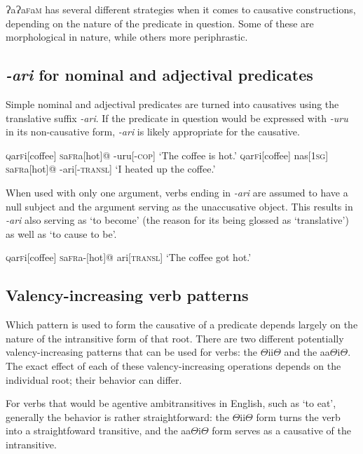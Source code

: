 \documentclass[a4paper,10pt,twoside,openright]{memoir}
\newcommand{\lang}{ɁaɁa\textsc{f}a\textsc{m}}
\newcommand{\rootpart}{$\Theta$}
\newcommand{\famword}[5]{#1\textsc{#2}#3\textsc{#4}#5}
\begin{document}
\lang{} has several different strategies when it comes to causative constructions, depending on the nature of the predicate in question. Some of these are morphological in nature, while others more periphrastic. 

\subsection{\textit{-ari} for nominal and adjectival predicates}

Simple nominal and adjectival predicates are turned into causatives using the translative suffix \textit{-ari}. If the predicate in question would be expressed with \textit{-uru} in its non-causative form, \textit{-ari} is likely appropriate for the causative.

\pex
\a
\begingl
\famword{}{q}{ar}{f}{i}[coffee]
\famword{}{s}{a}{fr}{a}[hot]@
-uru[\textsc{-cop}]
\glft `The coffee is hot.'
\endgl
\a
\begingl
\famword{}{q}{ar}{f}{i}[coffee]
nas[\textsc{1sg}]
\famword{}{s}{a}{fr}{a}[hot]@
-ari[-\textsc{transl}]
\glft `I heated up the coffee.'
\endgl
\xe

When used with only one argument, verbs ending in \textit{-ari} are assumed to have a null subject and the argument serving as the unaccusative object. This results in \textit{-ari} also serving as `to become' (the reason for its being glossed as `translative') as well as `to cause to be'.

\ex
\begingl
\famword{}{q}{ar}{f}{i}[coffee]
\famword{}{s}{a}{fr}{a}-[hot]@
ari[\textsc{transl}]
\glft `The coffee got hot.'
\endgl
\xe

\subsection{Valency-increasing verb patterns}

Which pattern is used to form the causative of a predicate depends largely on the nature of the intransitive form of that root. There are two different potentially valency-increasing patterns that can be used for verbs: the {\rootpart}ii{\rootpart} and the aa{\rootpart}i{\rootpart}. The exact effect of each of these valency-increasing operations depends on the individual root; their behavior can differ.

For verbs that would be agentive ambitransitives in English, such as `to eat', generally the behavior is rather straightforward: the {\rootpart}ii{\rootpart} form turns the verb into a straightfoward transitive, and the aa{\rootpart}i{\rootpart} form serves as a causative of the intransitive. 
\end{document}
